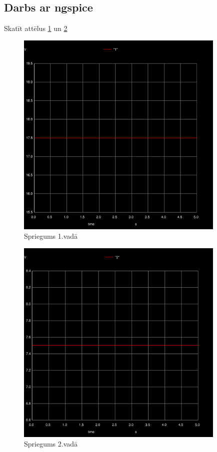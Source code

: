 \documentclass{report}
\begin{document}
\subsection{Darbs ar ngspice}
Skatīt attēlus \ref{fig:2.1} un \ref{fig:2.2} 
\begin{figure}[!h]
    \centering
    \includegraphics[width=10cm]{011.png}
    \caption{Spriegums 1.vadā}
    \label{fig:2.1}
    \end{figure}
 \begin{figure}[t]
 \centering
    \includegraphics[width=10cm]{013.png}
    \caption{Spriegums 2.vadā}
    \label{fig:2.2}
\end{figure}
\newpage
\end{document}
